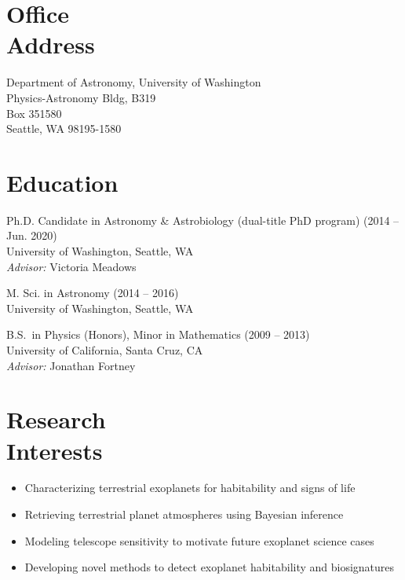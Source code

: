 \documentclass[margin,10pt]{res}
\begin{document}
\begin{resume}

\section{Office \\Address}
Department of Astronomy, University of Washington \\
Physics-Astronomy Bldg, B319 \\
Box 351580 \\
Seattle, WA 98195-1580 \\

\section{Education} 
Ph.D. Candidate in Astronomy \& Astrobiology (dual-title PhD program) \hfill (2014 -- Jun. 2020) \\
University of Washington, Seattle, WA  \\
\textit{Advisor:} Victoria Meadows 

M. Sci. in Astronomy \hfill (2014 -- 2016) \\
University of Washington, Seattle, WA 

B.S.\ in Physics (Honors), Minor in Mathematics \hfill (2009 -- 2013) \\
University of California, Santa Cruz, CA \\
\textit{Advisor:} Jonathan Fortney \\

\section{Research \\Interests}
                \begin{itemize}  \itemsep -1pt %
                        \item Characterizing terrestrial exoplanets for habitability and signs of life 
                        \item Retrieving terrestrial planet atmospheres using Bayesian inference 
                        \item Modeling telescope sensitivity to motivate future exoplanet science cases 
                        \item Developing novel methods to detect exoplanet habitability and biosignatures \\
                    \end{itemize}


\end{resume}
\end{document}

